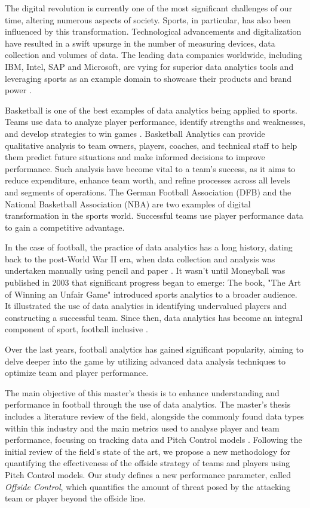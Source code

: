 \documentclass[
  10pt,
  twoside,nohyper]{book}
\begin{document}
The digital revolution is currently one of the most significant
challenges of our time, altering numerous aspects of society. Sports,
in particular, has also been influenced by this transformation.
Technological advancements and digitalization have resulted in a swift
upsurge in the number of measuring devices, data collection and volumes
of data. The leading data companies worldwide, including IBM, Intel, SAP
and Microsoft, are vying for superior data analytics tools and
leveraging sports as an example domain to showcase their products and
brand power \autocite{1}.

Basketball is one of the best examples of data analytics being
applied to sports. Teams use data to analyze player performance, identify strengths and weaknesses, and develop strategies to win games \autocite{2}. Basketball Analytics can provide qualitative analysis to team owners, players, coaches, and technical staff to help them predict future situations and make informed decisions to improve performance. Such analysis have become vital to a team's success, as it aims to reduce expenditure, enhance team worth, and refine processes across all levels and segments of operations. The German Football Association (DFB) and the National Basketball Association (NBA) are two examples of digital transformation in the sports world. Successful teams use player performance data to gain a competitive advantage.

In the case of football, the practice of data analytics has a long history, dating
back to the post-World War II era, when data collection and analysis was
undertaken manually using pencil and paper \autocite{1}. It wasn't until
Moneyball was published in 2003 that significant progress began to
emerge: The book, "The Art of Winning an Unfair Game" introduced
sports analytics to a broader audience. It illustrated the use of data
analytics in identifying undervalued players and constructing a
successful team. Since then, data analytics has become an integral
component of sport, football inclusive \autocite{1}.

Over the last years, football analytics has gained significant
popularity, aiming to delve deeper into the game by utilizing advanced
data analysis techniques to optimize team and player performance.

The main objective of this master's thesis is to enhance understanding and performance in football through the use of data analytics. The master's thesis includes a literature review of the field, alongside the commonly found data types within this industry and the main metrics used to analyse player and team performance, focusing on tracking data and Pitch Control models \autocite{Spearman}. Following the initial review of the field's state of the art, we propose a new methodology for quantifying the effectiveness of the offside strategy of teams and players using Pitch Control models. Our study defines a new performance parameter, called \emph{Offside Control}, which quantifies the amount of threat posed by the attacking team or player beyond the offside line.
\end{document}
